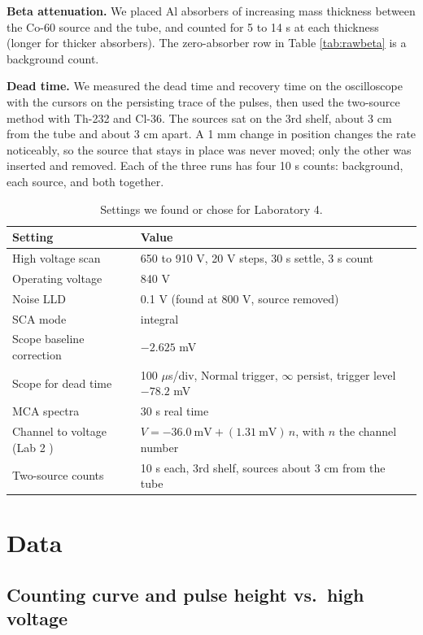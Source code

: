 \documentclass[12pt]{article}
\begin{document}
\textbf{Beta attenuation.} We placed Al absorbers of increasing mass thickness between the Co-60 source and the tube, and counted for 5 to 14 s at each thickness (longer for thicker absorbers). The zero-absorber row in Table \ref{tab:rawbeta} is a background count.

\textbf{Dead time.} We measured the dead time and recovery time on the oscilloscope with the cursors on the persisting trace of the pulses, then used the two-source method with Th-232 and Cl-36. The sources sat on the 3rd shelf, about 3 cm from the tube and about 3 cm apart. A 1 mm change in position changes the rate noticeably, so the source that stays in place was never moved; only the other was inserted and removed. Each of the three runs has four 10 s counts: background, each source, and both together.

\begin{table}[!htbp]
\centering\small
\begin{tabular}{ll}
\toprule
\textbf{Setting} & \textbf{Value} \\
\midrule
High voltage scan & 650 to 910 V, 20 V steps, 30 s settle, 3 s count \\
Operating voltage & 840 V \\
Noise LLD & 0.1 V (found at 800 V, source removed) \\
SCA mode & integral \\
Scope baseline correction & $-2.625$ mV \\
Scope for dead time & 100 $\mu$s/div, Normal trigger, $\infty$ persist, trigger level $-78.2$ mV \\
MCA spectra & 30 s real time \\
Channel to voltage (Lab 2 \cite{lab2}) & $V = -36.0\ \text{mV} + (1.31\ \text{mV})\,n$, with $n$ the channel number \\
Two-source counts & 10 s each, 3rd shelf, sources about 3 cm from the tube \\
\bottomrule
\end{tabular}
\caption{Settings we found or chose for Laboratory 4.}
\label{tab:settings}
\end{table}


\section{Data}

\subsection{Counting curve and pulse height vs.\ high voltage}
\end{document}
